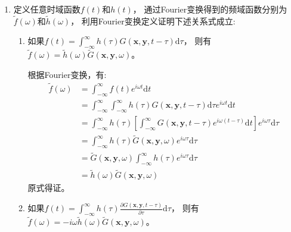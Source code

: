 \begin{enumerate}
    \item 定义任意时域函数$f(t)$和$h(t)$，
    通过Fourier变换得到的频域函数分别为$\tilde{f}(\omega)$和$\tilde{h}(\omega)$，
    利用Fourier变换定义证明下述关系式成立:
    \begin{enumerate}
        \item 如果$f(t) = \int_{-\infty}^{\infty} h(\tau) G(\mathbf{x},\mathbf{y},t-\tau) \mathrm{d} \tau$，
            则有$\tilde{f}(\omega) = \tilde{h}(\omega) \tilde{G} (\mathbf{x},\mathbf{y},\omega)$。

            根据Fourier变换，有:
            \begin{equation}
                \label{eq:conclusion 1}
                \begin{aligned}
                    \tilde{f}(\omega) &= \int_{-\infty}^{\infty} f(t) e^{i \omega t} \mathrm{d} t \\
                    &= \int_{-\infty}^{\infty} \int_{-\infty}^{\infty} h(\tau) G(\mathbf{x},\mathbf{y},t-\tau) \mathrm{d} \tau e^{i \omega t} \mathrm{d} t \\
                    &= \int_{-\infty}^{\infty} h(\tau) \left[ \int_{-\infty}^{\infty} G(\mathbf{x},\mathbf{y},t-\tau) e^{i \omega (t-\tau)} \mathrm{d} t \right] e^{i \omega \tau} \mathrm{d} \tau \\
                    &= \int_{-\infty}^{\infty} h(\tau) \tilde{G} (\mathbf{x},\mathbf{y},\omega) e^{i \omega \tau} \mathrm{d} \tau \\
                    &= \tilde{G} (\mathbf{x},\mathbf{y},\omega) \int_{-\infty}^{\infty} h(\tau) e^{i \omega \tau} \mathrm{d} \tau \\
                    &= \tilde{h}(\omega) \tilde{G} (\mathbf{x},\mathbf{y},\omega)
                \end{aligned}
            \end{equation}
            原式得证。


        \item 如果$f(t) = \int_{-\infty}^{\infty} h(\tau) \frac{\partial G(\mathbf{x},\mathbf{y},t-\tau)}{\partial \tau} \mathrm{d} \tau$，
            则有$\tilde{f}(\omega) = - i \omega \tilde{h}(\omega) \tilde{G} (\mathbf{x},\mathbf{y},\omega)$。


\end{enumerate}
\end{enumerate}
